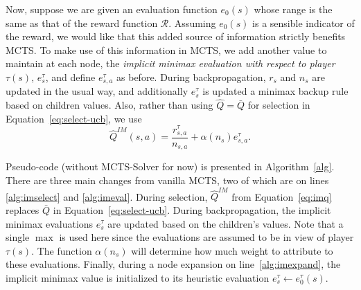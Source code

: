 \documentclass{article}
\newcommand{\bQ}{\bar{Q}}
\newcommand{\cR}{\mathcal{R}}
\newcommand{\hQ}{\hat{Q}}
\begin{document}
Now, suppose we are given an evaluation function $e_0(s)$ whose range is the same as that of the reward function $\cR$. 
Assuming $e_0(s)$ is a sensible indicator of the reward, we would like that this added source of information
strictly benefits MCTS. 
To make use of this information in MCTS, we add another value to maintain at each node, the 
{\it implicit minimax evaluation with respect to player} $\tau(s)$, $e^{\tau}_s$, and define $e^{\tau}_{s,a}$ as before. 
During backpropagation, $r_s$ and $n_s$ are updated in the usual way, and additionally $e^{\tau}_s$ is updated a minimax backup 
rule based on children values. Also, rather than using $\hQ = \bQ$ for selection in Equation~\ref{eq:select-ucb}, we use
\begin{equation}
\label{eq:imq}
\hQ^{\mathit{IM}}(s,a) = \frac{r^{\tau}_{s,a}}{n_{s,a}} + \alpha(n_s) e^{\tau}_{s,a}.
\end{equation}

Pseudo-code (without MCTS-Solver for now) is presented in Algorithm~\ref{alg}. There are three main changes from vanilla MCTS, two 
of which are on lines \ref{alg:imselect} and \ref{alg:imeval}. 
During selection, $\hQ^{\mathit{IM}}$ from Equation~\ref{eq:imq} replaces $\bQ$ in 
Equation~\ref{eq:select-ucb}. During backpropagation, the implicit minimax evaluations $e^{\tau}_s$ are updated based on 
the children's values. Note that a single $\max$ is used here since the evaluations are assumed to be in 
view of player $\tau(s)$.
The function $\alpha(n_s)$ will determine how much weight to attribute to these evaluations.  
Finally, during a node expansion on line~\ref{alg:imexpand}, the implicit minimax value is initialized to its heuristic
evaluation $e^{\tau}_s \leftarrow e^{\tau}_0(s)$. 

\newcommand{\MCTS}{{\sc MCTS}}
\newcommand{\Update}{{\sc Update}}
\newcommand{\Playout}{{\sc Playout}}
\newcommand{\Select}{{\sc Select}}
\newcommand{\Expand}{{\sc Expand}}
\newcommand{\Simulate}{{\sc Simulate}}
\end{document}
